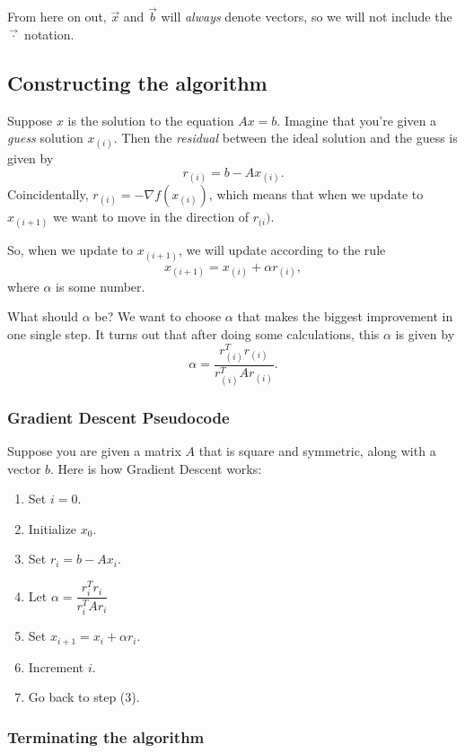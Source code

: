 \documentclass{article}
\begin{document}
From here on out, $\vec{x}$ and $\vec{b}$ will \emph{always} denote
vectors, so we will not include the $\vec{\cdot}$ notation.

\subsection{Constructing the
algorithm}\label{constructing-the-algorithm}

Suppose $x$ is the solution to the equation $Ax=b$. Imagine that you're
given a \emph{guess} solution $x_{(i)}$. Then the \emph{residual}
between the ideal solution and the guess is given by
\[r_{(i)} = b - Ax_{(i)}.\] Coincidentally,
$r_{(i)}=-\nabla f(x_{(i)})$, which means that when we update to
$x_{(i+1)}$ we want to move in the direction of $r_{(i})$.

So, when we update to $x_{(i+1)}$, we will update according to the rule
\[x_{(i+1)} = x_{(i)} + \alpha r_{(i)},\] where $\alpha$ is some number.

What should $\alpha$ be? We want to choose $\alpha$ that makes the
biggest improvement in one single step. It turns out that after doing
some calculations, this $\alpha$ is given by
\[ \alpha = \frac{r_{(i)}^T r_{(i)}}{r_{(i)}^T A r_{(i)}}. \]

\subsubsection{Gradient Descent
Pseudocode}\label{gradient-descent-pseudocode}

Suppose you are given a matrix $A$ that is square and symmetric, along
with a vector $b$. Here is how Gradient Descent works:

\begin{enumerate}
\def\labelenumi{\arabic{enumi}.}
\itemsep1pt\parskip0pt
\item
  Set $i=0$.
\item
  Initialize $x_0$.
\item
  Set $r_i = b - Ax_i$.
\item
  Let $\alpha = \dfrac{r_i^Tr_i}{r_i^TAr_i}$
\item
  Set $x_{i+1} = x_i + \alpha r_i$.
\item
  Increment $i$.
\item
  Go back to step (3).
\end{enumerate}

\subsubsection{Terminating the
algorithm}\label{terminating-the-algorithm}
\end{document}
